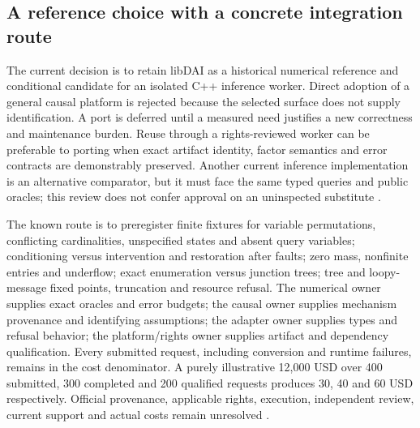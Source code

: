 \subsection{A reference choice with a concrete integration route}
The current decision is to retain libDAI as a historical numerical reference
and conditional candidate for an isolated C++ inference worker. Direct
adoption of a general causal platform is rejected because the selected
surface does not supply identification. A port is deferred until a measured
need justifies a new correctness and maintenance burden. Reuse through a
rights-reviewed worker can be preferable to porting when exact artifact
identity, factor semantics and error contracts are demonstrably preserved.
Another current inference implementation is an alternative comparator,
but it must face the same typed queries and public oracles; this review does
not confer approval on an uninspected substitute \cite{exec24_libdai_choice}.

The known route is to preregister finite fixtures for variable permutations,
conflicting cardinalities, unspecified states and absent query variables;
conditioning versus intervention and restoration after faults; zero mass,
nonfinite entries and underflow; exact enumeration versus junction trees;
tree and loopy-message fixed points, truncation and resource refusal.
The numerical owner supplies exact oracles and error budgets; the causal
owner supplies mechanism provenance and identifying assumptions; the
adapter owner supplies types and refusal behavior; the platform/rights owner
supplies artifact and dependency qualification. Every submitted request,
including conversion and runtime failures, remains in the cost denominator.
A purely illustrative 12,000 USD over 400 submitted, 300 completed and
200 qualified requests produces 30, 40 and 60 USD respectively.
Official provenance, applicable rights, execution, independent review, current support and actual costs remain unresolved \cite{exec24_libdai_choice}.
